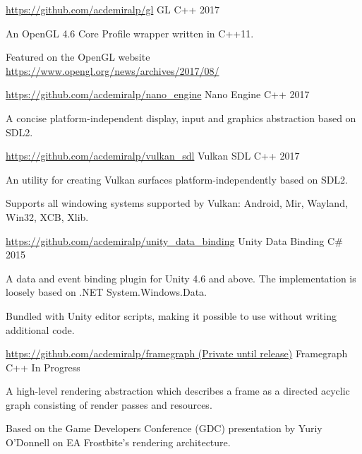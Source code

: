 \begin{cventries}
  \cventry
    {\href{https://github.com/acdemiralp/gl}{https://github.com/acdemiralp/gl}}
    {GL}
    {C++}
    {2017}
    {
      \begin{cvitems}
        \item {An OpenGL 4.6 Core Profile wrapper written in C++11.}
        \item {Featured on the OpenGL website  \href{https://www.opengl.org/news/archives/2017/08/}{https://www.opengl.org/news/archives/2017/08/} }
      \end{cvitems}
    }
    
  \cventry
    {\href{https://github.com/acdemiralp/nano_engine}{https://github.com/acdemiralp/nano\_engine}}
    {Nano Engine}
    {C++}
    {2017}
    {
      \begin{cvitems}
        \item {A concise platform-independent display, input and graphics abstraction based on SDL2.}
      \end{cvitems}
    }
     
  \cventry
    {\href{https://github.com/acdemiralp/vulkan_sdl}{https://github.com/acdemiralp/vulkan\_sdl}}
    {Vulkan SDL}
    {C++}
    {2017}
    {
      \begin{cvitems}
        \item {An utility for creating Vulkan surfaces platform-independently based on SDL2.}
        \item {Supports all windowing systems supported by Vulkan: Android, Mir, Wayland, Win32, XCB, Xlib.}
      \end{cvitems}
    }
   
  \cventry
    {\href{https://github.com/acdemiralp/unity_data_binding}{https://github.com/acdemiralp/unity\_data\_binding}}
    {Unity Data Binding}
    {C\#}
    {2015}
    {
      \begin{cvitems}
        \item {A data and event binding plugin for Unity 4.6 and above. The implementation is loosely based on .NET System.Windows.Data.}
        \item {Bundled with Unity editor scripts, making it possible to use without writing additional code.}
      \end{cvitems}
    } 
  \cventry
    {\href{https://github.com/acdemiralp/framegraph}{https://github.com/acdemiralp/framegraph (Private until release)}}
    {Framegraph}
    {C++}
    {In Progress}
    {
      \begin{cvitems}
        \item {A high-level rendering abstraction which describes a frame as a directed acyclic graph consisting of render passes and resources.}
        \item {Based on the Game Developers Conference (GDC) presentation by Yuriy O'Donnell on EA Frostbite's rendering architecture.}
      \end{cvitems}
    }
   

\end{cventries}

